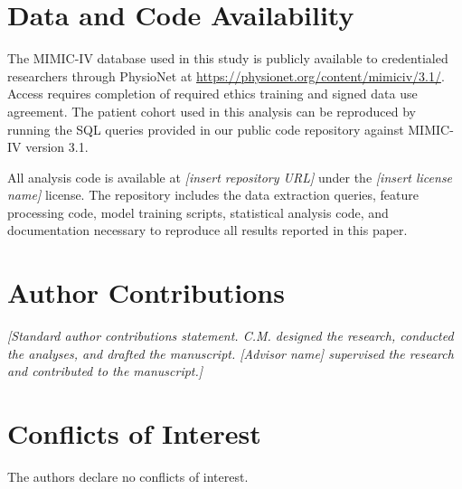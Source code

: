 \documentclass[11pt,a4paper]{article}
\newcommand{\placeholder}[1]{\textcolor{placeholdergray}{\textit{[#1]}}}
\begin{document}
\section*{Data and Code Availability}

The MIMIC-IV database used in this study is publicly available to
credentialed researchers through PhysioNet at
\url{https://physionet.org/content/mimiciv/3.1/}. Access requires
completion of required ethics training and signed data use agreement.
The patient cohort used in this analysis can be reproduced by running
the SQL queries provided in our public code repository against
MIMIC-IV version 3.1.

All analysis code is available at \placeholder{insert repository URL}
under the \placeholder{insert license name} license. The repository
includes the data extraction queries, feature processing code, model
training scripts, statistical analysis code, and documentation
necessary to reproduce all results reported in this paper.

%

\section*{Author Contributions}

\placeholder{Standard author contributions statement. C.M. designed
the research, conducted the analyses, and drafted the manuscript.
[Advisor name] supervised the research and contributed to the manuscript.}


\section*{Conflicts of Interest}

The authors declare no conflicts of interest.

%


\end{document}

